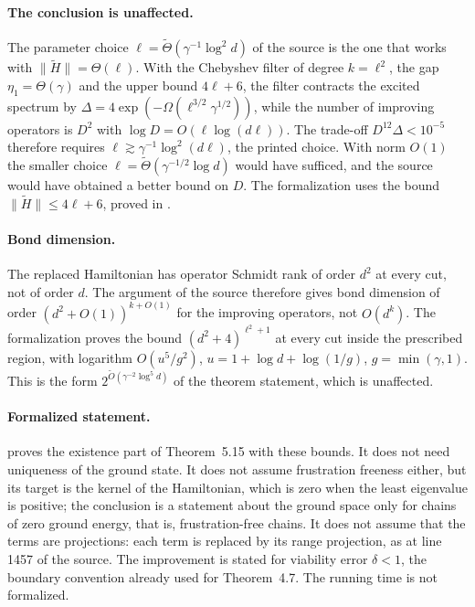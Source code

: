 \documentclass{article}
\begin{document}
\paragraph{The conclusion is unaffected.}
The parameter choice $\ell=\widetilde\Theta(\gamma^{-1}\log^2d)$ of the source
is the one that works with $\|\widetilde H\|=\Theta(\ell)$. With the Chebyshev
filter of degree $k=\ell^2$, the gap $\eta_1=\Theta(\gamma)$ and the upper bound
$4\ell+6$, the filter contracts the excited spectrum by
$\Delta=4\exp(-\Omega(\ell^{3/2}\gamma^{1/2}))$, while the number of improving
operators is $D^2$ with $\log D=O(\ell\log(d\ell))$. The trade-off
$D^{12}\Delta<10^{-5}$ therefore requires $\ell\gtrsim\gamma^{-1}\log^2(d\ell)$,
the printed choice. With norm $O(1)$ the smaller choice
$\ell=\widetilde\Theta(\gamma^{-1/2}\log d)$ would have sufficed, and the
source would have obtained a better bound on $D$. The formalization uses the
bound $\|\widetilde H\|\le4\ell+6$, proved in
.

\paragraph{Bond dimension.}
The replaced Hamiltonian has operator Schmidt rank of order $d^2$ at every cut,
not of order $d$. The argument of the source therefore gives bond dimension of
order $(d^2+O(1))^{k+O(1)}$ for the improving operators, not $O(d^k)$. The
formalization proves the bound $(d^2+4)^{\ell^2+1}$ at every cut inside the
prescribed region, with logarithm $O(u^5/g^2)$, $u=1+\log d+\log(1/g)$,
$g=\min(\gamma,1)$. This is the form $2^{\widetilde O(\gamma^{-2}\log^5d)}$ of
the theorem statement, which is unaffected.

\paragraph{Formalized statement.}
proves the existence part of Theorem~5.15 with these bounds. It does not need
uniqueness of the ground state. It does not assume frustration freeness either,
but its target is the kernel of the Hamiltonian, which is zero when the least
eigenvalue is positive; the conclusion is a statement about the ground space
only for chains of zero ground energy, that is, frustration-free chains. It does
not assume that the terms are projections: each term is replaced by its range projection,
as at line 1457 of the source. The improvement is stated for viability error
$\delta<1$, the boundary convention already used for Theorem~4.7. The running
time is not formalized.



\end{document}
